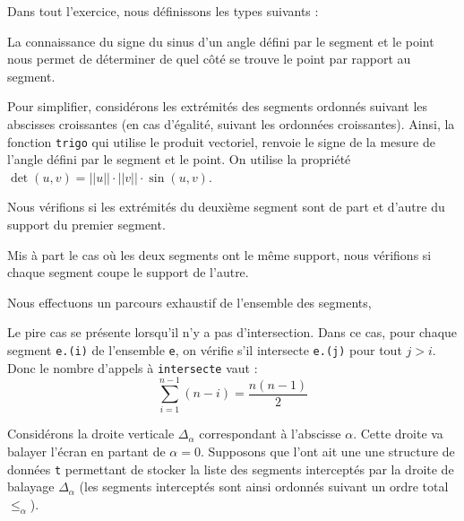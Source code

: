 Dans tout l'exercice, nous définissons les types suivants :



\Q
La connaissance du signe du sinus d'un angle défini par le segment et le point nous permet de déterminer de quel côté se trouve le point par rapport au segment.
\medskip


Pour simplifier, considérons les extrémités des segments ordonnés suivant les abscisses croissantes (en cas d'égalité, suivant les ordonnées croissantes). Ainsi, la fonction \texttt{trigo} qui utilise le produit vectoriel, renvoie le signe de la mesure de l'angle défini par le segment et le point. On utilise la propriété $\det(u,v) = ||u||\cdot||v||\cdot\sin(u,v)$.



\Q
Nous vérifions si les extrémités du deuxième segment sont de part et d'autre du support du premier segment.



\Q
Mis à part le cas où les deux segments ont le même support, nous vérifions si chaque segment coupe le support de l'autre.



\Q
Nous effectuons un parcours exhaustif de l'ensemble des segments,



Le pire cas se présente lorsqu'il n'y a pas d'intersection. Dans ce cas, pour chaque segment \texttt{e.(i)} de l'ensemble \texttt{e}, on vérifie s'il intersecte \texttt{e.(j)} pour tout $j>i$. Donc le nombre d'appels à \texttt{intersecte} vaut :
\[
    \sum_{i=1}^{n-1}(n-i)=\frac{n(n-1)}{2}
\]

\Q
Considérons la droite verticale $\Delta_\alpha$ correspondant à l'abscisse $\alpha$. Cette droite va balayer l'écran en partant de $\alpha=0$. Supposons que l'ont ait une une structure de données \texttt{t} permettant de stocker la liste des segments interceptés par la droite de balayage $\Delta_\alpha$ (les segments interceptés sont ainsi ordonnés suivant un ordre total $\leq_\alpha$).